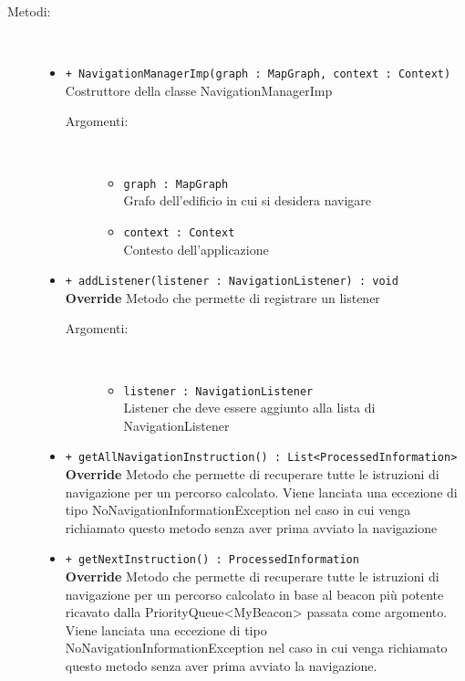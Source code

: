 \documentclass[../DefinizioneDiProdotto.tex]{subfiles}
\begin{document}
\begin{description}
\begin{itemize}
	\end{itemize}
	\item[Metodi:] \
	\begin{itemize}
		\item \texttt{+ NavigationManagerImp(graph : MapGraph, context : Context)}\\
		Costruttore della classe NavigationManagerImp
		\begin{description}
			\item[Argomenti:] \
			\begin{itemize}
				\item \texttt{graph : MapGraph}\\
				Grafo dell'edificio in cui si desidera navigare\item \texttt{context : Context}\\
				Contesto dell'applicazione\end{itemize}
		\end{description}
		\item \texttt{+ addListener(listener : NavigationListener) : void}\\
		\textbf{Override} Metodo che permette di registrare un listener
		\begin{description}
			\item[Argomenti:] \
			\begin{itemize}
				\item \texttt{listener : NavigationListener}\\
				Listener che deve essere aggiunto alla lista di NavigationListener\end{itemize}
		\end{description}
		\item \texttt{+ getAllNavigationInstruction() : List<ProcessedInformation>}\\
		\textbf{Override} Metodo che permette di recuperare tutte le istruzioni di navigazione per un percorso calcolato. Viene lanciata una eccezione di tipo NoNavigationInformationException nel caso in cui venga richiamato questo metodo senza aver prima avviato la navigazione
		\item \texttt{+ getNextInstruction() : ProcessedInformation}\\
		\textbf{Override} Metodo che permette di recuperare tutte le istruzioni di navigazione per un percorso calcolato in base al beacon più potente ricavato dalla PriorityQueue<MyBeacon> passata come argomento. Viene lanciata una eccezione di tipo NoNavigationInformationException nel caso in cui venga richiamato questo metodo senza aver prima avviato la navigazione.

\end{itemize}
\end{description}
\end{document}
